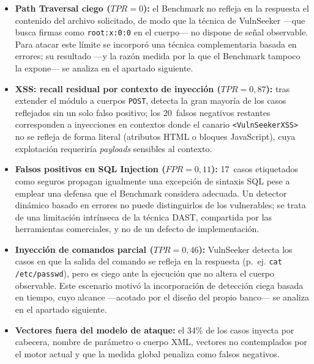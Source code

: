 \documentclass[12pt, a4paper]{article}
\begin{document}
\begin{itemize}
    \item \textbf{Path Traversal ciego ($TPR = 0$):} el Benchmark no refleja en la
    respuesta el contenido del archivo solicitado, de modo que la técnica de
    VulnSeeker ---que busca firmas como \texttt{root:x:0:0} en el cuerpo--- no
    dispone de señal observable. Para atacar este límite se incorporó una técnica
    complementaria basada en errores; su resultado ---y la razón medida por la que
    el Benchmark tampoco la expone--- se analiza en el apartado siguiente.

    \item \textbf{XSS: recall residual por contexto de inyección ($TPR = 0{,}87$):}
    tras extender el módulo a cuerpos \texttt{POST}, detecta la gran mayoría de los
    casos reflejados sin un solo falso positivo; los 20~falsos negativos restantes
    corresponden a inyecciones en contextos donde el canario \texttt{<VulnSeekerXSS>}
    no se refleja de forma literal (atributos HTML o bloques JavaScript), cuya
    explotación requeriría \textit{payloads} sensibles al contexto.

    \item \textbf{Falsos positivos en SQL Injection ($FPR = 0{,}11$):} 17~casos
    etiquetados como seguros propagan igualmente una excepción de sintaxis SQL
    pese a emplear una defensa que el Benchmark considera adecuada. Un detector
    dinámico basado en errores no puede distinguirlos de los vulnerables; se trata
    de una limitación intrínseca de la técnica DAST, compartida por las
    herramientas comerciales, y no de un defecto de implementación.

    \item \textbf{Inyección de comandos parcial ($TPR = 0{,}46$):} VulnSeeker
    detecta los casos en que la salida del comando se refleja en la respuesta
    (p.~ej. \texttt{cat /etc/passwd}), pero es ciego ante la ejecución que no altera
    el cuerpo observable. Este escenario motivó la incorporación de detección ciega
    basada en tiempo, cuyo alcance ---acotado por el diseño del propio banco--- se
    analiza en el apartado siguiente.

    \item \textbf{Vectores fuera del modelo de ataque:} el 34\% de los casos inyecta
    por cabecera, nombre de parámetro o cuerpo XML, vectores no contemplados por el
    motor actual y que la medida global penaliza como falsos negativos.
\end{itemize}
\end{document}
